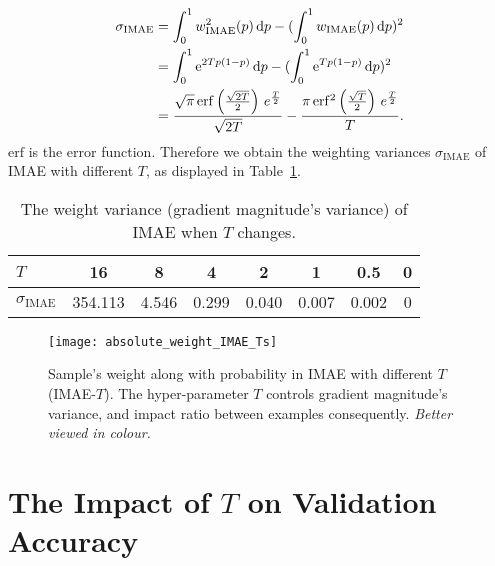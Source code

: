 \documentclass{article}
\begin{document}
\begin{equation}
	\begin{aligned}
		\sigma_{\mathrm{IMAE}}&=
		\displaystyle\int^{1}_{0} 
		w_{\mathrm{\mathrm{IMAE}}}^{2} (p)
		\, \mathrm d p
		- (\displaystyle\int^{1}_{0} 
		w_{\mathrm{IMAE}} (p)
		\, \mathrm d p)^2 \\
		&=
		\displaystyle\int^{1}_{0} \mathrm{e}^{2Tp{}\left(1-p\right)}\, \mathrm d p
		-
		(\displaystyle\int^{1}_{0} \mathrm{e}^{Tp{}\left(1-p\right)}\, \mathrm d p)^2 \\
		&=
		{{\sqrt{\pi}\,\mathrm{erf}\left({{\sqrt{2T}}\over{{2}}}\right)
				\,e^{{{T}\over{2}}}}\over{\sqrt{2T}}}
		-
		{{{\pi}\,\mathrm{erf^2}\left({{\sqrt{T}}\over{2}}\right)\,e^{{{T
						}\over{2}}}}\over{{T}}}
		.
	\end{aligned}
\end{equation}
$\mathrm{erf}$ is the error function. 
Therefore we obtain the weighting variances $\sigma_{\mathrm{IMAE}}$ of IMAE with different $T$, as displayed in Table~\ref{table:variance_IMAE_T}.  


\begin{table}[!h]
	\vspace{-0.0cm}
	\caption{
		The weight variance (gradient magnitude's variance) of IMAE when $T$ changes.
	}
	\centering
	\setlength{\tabcolsep}{3.5pt} \begin{tabular}{lccccccc}
		\hline
		$T$  & 16 & 8 & 4 & 2 & 1 & 0.5 & 0\\
		\hline
		$\sigma_{\mathrm{IMAE}}$ & 354.113 & 4.546 & 0.299 & 0.040 & 0.007 & 0.002 & 0\\
		\hline
	\end{tabular}
	\label{table:variance_IMAE_T}
\end{table}


\begin{figure}[!h]
	\centering
	\texttt{[image: absolute\_weight\_IMAE\_Ts]}
	\caption{
		Sample's weight along with probability in IMAE with different $T$ (IMAE-$T$). 
The hyper-parameter $T$ controls gradient magnitude's variance, and impact ratio between examples consequently.
\textit{Better viewed in colour.}
	}
	\label{fig:absolute_weight_IMAE_Ts}
	\vspace{-0.4cm}
\end{figure}




\section{The Impact of $T$ on Validation Accuracy}
\label{sec:test_accuracies}
\end{document}
